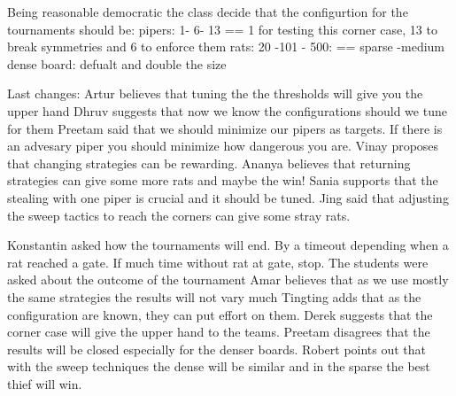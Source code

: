 Being reasonable democratic the class decide that the configurtion for the tournaments should be:
pipers: 1- 6- 13 == 1 for testing this corner case, 13 to break symmetries and 6 to enforce them
rats: 20 -101 - 500: == sparse -medium dense
board: defualt and double the size

Last changes:
Artur believes that tuning the the thresholds will give you the upper hand
Dhruv suggests that now we know the configurations should we tune for them
Preetam said that we should minimize our pipers as targets. If there is an advesary piper
you should minimize how dangerous you are.
Vinay proposes that changing strategies can be rewarding.
Ananya believes that returning strategies can give some more rats and maybe the win!
Sania supports that the stealing with one piper is crucial and it should be tuned.
Jing said that adjusting the sweep tactics to reach the corners can give some 
stray rats.

Konstantin asked how the tournaments will end. By a timeout depending when a rat 
reached a gate. If much time without rat at gate, stop.
The students were asked about the outcome of the tournament
Amar believes that as we use mostly the same strategies the results will not vary much
Tingting adds that as the configuration are known, they can put effort on them.
Derek suggests that the corner case will give the upper hand to the teams.
Preetam disagrees that the results will be closed especially for the denser boards.
Robert points out that with the sweep techniques the dense will be similar and in the sparse the best thief will win.
